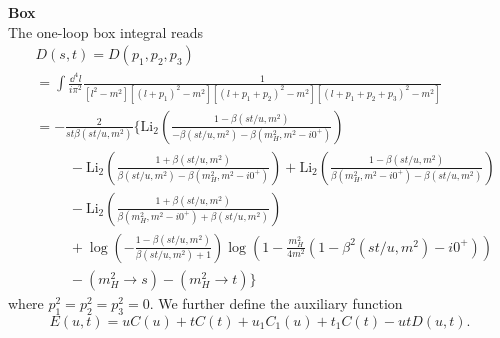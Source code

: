 \textbf{Box} \\
The one-loop box integral reads
\begin{equation}
\begin{split}
&D(s, t) = D(p_1, p_2, p_3) \\
& = \int \frac{\dd^4 l}{i \pi^2} \frac{1}{[l^2 - m^2] [(l + p_1)^2 - m^2] [(l + p_1 + p_2)^2 - m^2][(l + p_1 + p_2 + p_3)^2 - m^2]} \\
& = -\frac{2}{st \beta(st/u, m^2)} \bigg \lbrace \mathrm{Li}_2\!\left( \frac{1 - \beta (st/u, m^2)}{- \beta(st/u, m^2) - \beta(m_H^2, m^2 - i0^+)} \right)  \\
& \hspace{1cm} - \mathrm{Li}_2\!\left( \frac{1 + \beta (st/u, m^2)}{\beta(st/u, m^2) - \beta(m_H^2, m^2 - i0^+)} \right) + \mathrm{Li}_2\!\left( \frac{1 - \beta (st/u, m^2)}{\beta(m_H^2, m^2 - i0^+) - \beta(st/u, m^2)} \right) \\
& \hspace{1cm}  - \mathrm{Li}_2\!\left( \frac{1 + \beta (st/u, m^2)}{\beta(m_H^2, m^2 - i0^+) + \beta(st/u, m^2)} \right) \\
&\hspace{1cm} + \log\!\left(- \frac{1 - \beta(st/u, m^2)}{\beta(st/u, m^2) + 1} \right) \log\left(1 - \frac{m_H^2}{4 m^2} (1 - \beta^2(st/u, m^2) - i0^+) \right) \\
& \hspace{1cm} - (m_H^2 \rightarrow s) - (m_H^2 \rightarrow t)\bigg \rbrace
\end{split}
\end{equation}
where $p_1^2 = p_2^2 = p_3^2 = 0$. We further define the auxiliary function
\begin{equation}
E(u, t) = u C(u) + t C(t) + u_1 C_1(u) + t_1 C(t) - u t D(u, t).
\end{equation}
